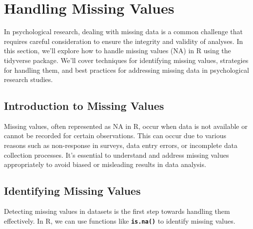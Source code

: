 \documentclass[
]{book}
\begin{document}
\hypertarget{handling-missing-values}{%
\section{Handling Missing Values}\label{handling-missing-values}}

In psychological research, dealing with missing data is a common challenge that requires careful consideration to ensure the integrity and validity of analyses. In this section, we'll explore how to handle missing values (NA) in R using the tidyverse package. We'll cover techniques for identifying missing values, strategies for handling them, and best practices for addressing missing data in psychological research studies.

\hypertarget{introduction-to-missing-values}{%
\subsection{\texorpdfstring{\textbf{Introduction to Missing Values}}{Introduction to Missing Values}}\label{introduction-to-missing-values}}

Missing values, often represented as NA in R, occur when data is not available or cannot be recorded for certain observations. This can occur due to various reasons such as non-response in surveys, data entry errors, or incomplete data collection processes. It's essential to understand and address missing values appropriately to avoid biased or misleading results in data analysis.

\hypertarget{identifying-missing-values}{%
\subsection{\texorpdfstring{\textbf{Identifying Missing Values}}{Identifying Missing Values}}\label{identifying-missing-values}}

Detecting missing values in datasets is the first step towards handling them effectively. In R, we can use functions like \textbf{\texttt{is.na()}} to identify missing values.
\end{document}
